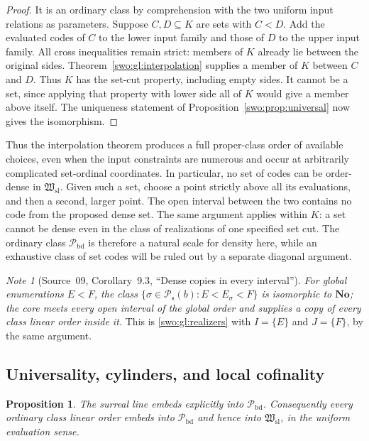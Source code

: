 \documentclass[11pt]{article}
\newtheorem{proposition}[proposition]{Proposition}
\theoremstyle{definition}
\theoremstyle{remark}
\newtheorem{note}[note]{Note}
\newcommand{\No}{\mathbf{No}}
\newcommand{\Hsl}{\mathfrak W_{\mathrm{sl}}}
\newcommand{\Pbd}{\mathcal P_{\mathrm{bd}}}
\newcommand{\Psupp}{\mathcal P_{\mathrm{s}}}
\begin{document}
\begin{proof}
It is an ordinary class by comprehension with the two uniform input relations
as parameters.  Suppose $C,D\subseteq K$ are sets with $C<D$.  Add the
evaluated codes of $C$ to the lower input family and those of $D$ to the upper
input family.  All cross inequalities remain strict: members of $K$ already
lie between the original sides.  Theorem~\ref{swo:gl:interpolation} supplies a
member of $K$ between $C$ and $D$.  Thus $K$ has the set-cut property,
including empty sides.  It cannot be a set, since applying that property
with lower side all of $K$ would give a member above itself.  The uniqueness
statement of Proposition~\ref{swo:prop:universal} now gives the isomorphism.
\end{proof}

Thus the interpolation theorem produces a full proper-class order of
available choices, even when the input constraints are numerous and occur
at arbitrarily complicated set-ordinal coordinates.  In particular, no set
of codes can be order-dense in $\Hsl$.  Given such a set, choose a point
strictly above all its evaluations, and then a second, larger point.  The
open interval between the two contains no code from the proposed dense set.
The same argument applies within $K$: a set cannot be dense even in the
class of realizations of one specified set cut.  The ordinary class
$\Pbd$ is therefore a natural scale for density here, while an exhaustive
class of set codes will be ruled out by a separate diagonal argument.


\begin{note}[Source~09, Corollary~9.3, ``Dense copies in every interval'']\label{swo:ec:cor:intervals}
\emph{For global enumerations $E<F$, the class
$\{\sigma\in\Psupp(b):E<E_\sigma<F\}$ is isomorphic to $\No$; the core meets
every open interval of the global order and supplies a copy of every class
linear order inside it.} This is \cref{swo:gl:realizers} with
$I=\{E\}$ and $J=\{F\}$, by the same argument.
\end{note}

\subsection{Universality, cylinders, and local cofinality}

\begin{proposition}\label{swo:gl:universality}
The surreal line embeds explicitly into $\Pbd$.  Consequently every ordinary
class linear order embeds into $\Pbd$ and hence into $\Hsl$, in the uniform
evaluation sense.
\end{proposition}
\end{document}
